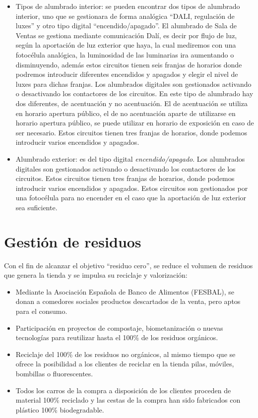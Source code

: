 \begin{multicols}{2}
\begin{itemize}
\item Tipos de alumbrado interior: se pueden encontrar dos tipos de alumbrado interior, uno que se gestionara de forma
analógica “DALI, regulación de luxes” y otro tipo digital “encendido/apagado”. El alumbrado de Sala de Ventas se gestiona
mediante comunicación Dalí, es decir por flujo de luz, según la aportación de luz exterior que haya, la cual mediremos con
una fotocélula analógica, la luminosidad de las luminarias ira aumentando o disminuyendo, además estos circuitos
tienen seis franjas de horarios donde podremos introducir diferentes encendidos y apagados y elegir el nivel de luxes
para dichas franjas. Los alumbrados digitales son gestionados activando o desactivando los contactores de los circuitos.
En este tipo de alumbrado hay dos diferentes, de acentuación y no acentuación. El de acentuación se utiliza en horario
apertura público, el de no acentuación aparte de utilizarse en horario apertura público, se puede utilizar en horario de
exposición en caso de ser necesario. Estos circuitos tienen tres franjas de horarios, donde podemos introducir varios
encendidos y apagados.
\item Alumbrado exterior: es del tipo digital \emph{encendido/apagado}. Los alumbrados digitales son gestionados activando o
desactivando los contactores de los circuitos. Estos circuitos tienen tres franjas de horarios, donde podemos introducir
varios encendidos y apagados. Estos circuitos son gestionados por una fotocélula para no encender en el caso que la
aportación de luz exterior sea suficiente.
\end{itemize}

\section{Gestión de residuos}

Con el fin de alcanzar el objetivo “residuo cero”, se reduce el volumen de residuos que genera la tienda y se impulsa su reciclaje y
valorización:
\begin{itemize}
\item Mediante la Asociación Española de Banco de Alimentos (FESBAL), se donan a comedores sociales productos descartados
de la venta, pero aptos para el consumo.
\item Participación en proyectos de compostaje, biometanización o nuevas tecnologías para reutilizar hasta el 100\% de los residuos orgánicos.
\item Reciclaje del 100\% de los residuos no orgánicos, al mismo tiempo que se ofrece la posibilidad a los clientes de reciclar en la
tienda pilas, móviles, bombillas o fluorescentes.
\item Todos los carros de la compra a disposición de los clientes proceden de material 100\% reciclado y las cestas de la compra
han sido fabricados con plástico 100\% biodegradable.
\end{itemize}


\end{multicols}
